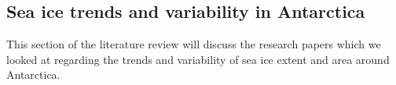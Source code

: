 \subsection{Sea ice trends and variability in Antarctica}
This section of the literature review will discuss the research papers which we looked at regarding the trends and variability of sea ice extent and area around Antarctica.